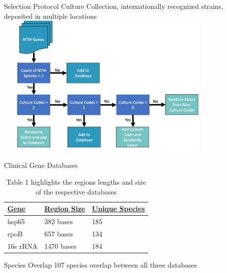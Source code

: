 \documentclass[11pt, xcolor=table]{beamer}
\begin{document}
  \begin{frame}{Selection Protocol}
  \center
  Culture Collection, internationally recognized strains, deposited in multiple locations
  \includegraphics[height=7cm, width=11cm]{CPBS_11_18/Selection_Protocol.jpg}
  \end{frame}
  \begin{frame}{Clinical Gene Databases}
  \begin{table}[]
  \begin{tabular}{|l|l|l|}
  \hline
  {\ul \textbf{Gene}} & {\ul \textbf{Region Size}} & {\ul \textbf{Unique Species}} \\     \hline
  hsp65 & 382 bases & 185 \\ \hline
  rpoB & 657 bases & 134 \\ \hline
  16s rRNA & 1470 bases & 184 \\ \hline
  \end{tabular}
  \caption{Table 1 highlights the regions lengths and size of the respective databases}
  \label{Test_Table}
  \end{table}
  \begin{block}{Species Overlap}
  107 species overlap between all three databases
  \end{block}
  \end{frame}
\end{document}

